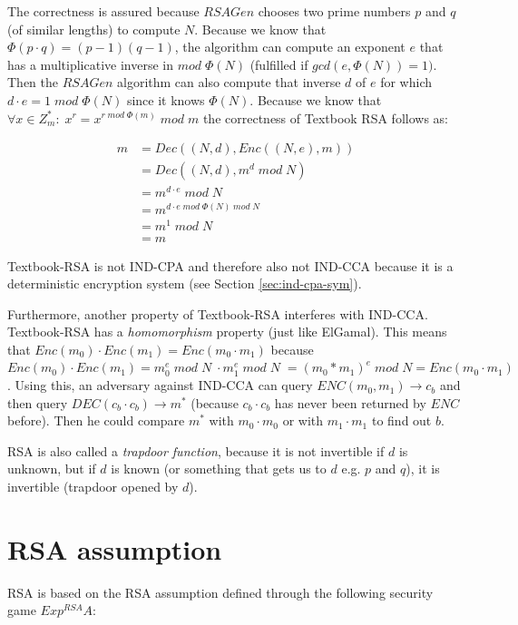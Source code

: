 The correctness is assured because $RSAGen$ chooses two prime numbers $p$ and $q$ (of similar lengths) to compute $N$.
Because we know that $\Phi(p \cdot q) = (p-1)(q-1)$, the algorithm can compute an exponent $e$ that has a multiplicative inverse in $mod\; \Phi(N)$ (fulfilled if $gcd(e, \Phi(N)) = 1)$.
Then the $RSAGen$ algorithm can also compute that inverse $d$ of $e$ for which $d \cdot e = 1 \;mod\; \Phi(N)$ since it knows $\Phi(N)$.
Because we know that $\forall x \in Z_m^* :\; x^r = x^{r \;mod\; \Phi(m)} \;mod\; m $ the correctness of Textbook RSA follows as:

\begin{align*}
    m & = Dec((N,d), Enc((N,e), m))               \\
      & = Dec((N,d), m^d \;mod\; N)               \\
      & = m^{d \cdot e} \;mod\; N                 \\
      & = m^{d \cdot e \;mod\; \Phi(N) \;mod\; N} \\
      & = m^1 \;mod\; N                           \\
      & = m
\end{align*}

Textbook-RSA is not IND-CPA and therefore also not IND-CCA because it is a deterministic encryption system (see Section \ref{sec:ind-cpa-sym}).

Furthermore, another property of Textbook-RSA interferes with IND-CCA.
Textbook-RSA has a \emph{homomorphism} property (just like ElGamal).
This means that $Enc(m_0) \cdot Enc(m_1) = Enc(m_0 \cdot m_1)$ because $Enc(m_0) \cdot Enc(m_1) = m_0^e \;mod\;N\; \cdot m_1^e \;mod\;N\; = (m_0 * m_1)^e \;mod\;N = Enc(m_0 \cdot m_1)$.
Using this, an adversary against IND-CCA can query $ENC(m_0, m_1) \rightarrow c_b$ and then query $DEC(c_b \cdot c_b) \rightarrow m^*$ (because $c_b \cdot c_b$ has never been returned by $ENC$ before).
Then he could compare $m^*$ with $m_0 \cdot m_0$ or with $m_1 \cdot m_1$ to find out $b$.

RSA is also called a \emph{trapdoor function}, because it is not invertible if $d$ is unknown, but if $d$ is known (or something that gets us to $d$ e.g. $p$ and $q$), it is invertible (trapdoor opened by $d$).

\section{RSA assumption}

RSA is based on the RSA assumption defined through the following security game $Exp^{RSA}{A}$:

